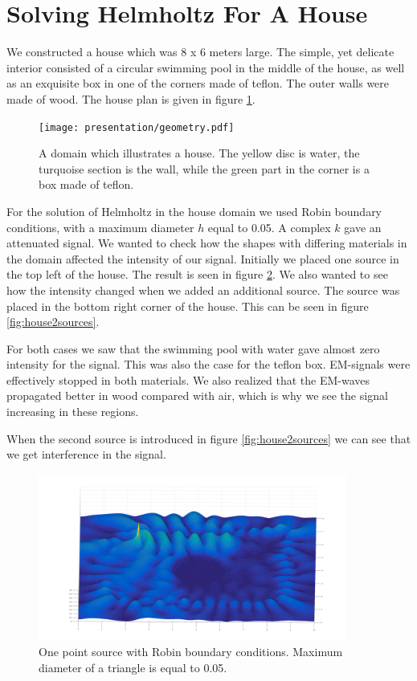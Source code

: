\documentclass[10pt,a4paper]{article}
\begin{document}
\section*{Solving Helmholtz For A House}
We constructed a house which was 8 x 6 meters large. The simple, yet delicate interior consisted of a circular swimming pool in the middle of the house, as well as an exquisite box in one of the corners made of teflon. The outer walls were made of wood. The house plan is given in figure \ref{fig:housePlan}. 

\begin{figure}[H]
\centering
    \texttt{[image: presentation/geometry.pdf]}
	\caption{A domain which illustrates a house. The yellow disc is water, the turquoise section is the wall, while the green part in the corner is a box made of teflon.}
  \label{fig:housePlan}
\end{figure}

For the solution of Helmholtz in the house domain we used Robin boundary conditions, with a maximum diameter $h$ equal to 0.05. A complex $k$ gave an attenuated signal. We wanted to check how the shapes with differing materials in the domain affected the intensity of our signal. Initially we placed one source in the top left of the house. The result is seen in figure \ref{fig:house1source}. We also wanted to see how the intensity changed when we added an additional source. The source was placed in the bottom right corner of the house. This can be seen in figure \ref{fig:house2sources}. 

For both cases we saw that the swimming pool with water gave almost zero intensity for the signal. This was also the case for the teflon box. EM-signals were effectively stopped in both materials. We also realized that the EM-waves propagated better in wood compared with air, which is why we see the signal increasing in these regions.

When the second source is introduced in figure \ref{fig:house2sources} we can see that we get interference in the signal.

\begin{figure}[H]
\centering
    \includegraphics[width=0.9\textwidth]{figures/house_topleft_source.pdf}
	\caption{One point source with Robin boundary conditions. Maximum diameter of a triangle is equal to 0.05. }
  \label{fig:house1source}
\end{figure}
\end{document}
